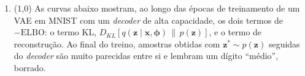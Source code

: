 \documentclass[11pt,a4paper]{article}
\begin{document}
\begin{enumerate}[1)]
\pagebreak
\item (1{,}0) As curvas abaixo mostram, ao longo das épocas de treinamento de um VAE em MNIST com um \textit{decoder} de alta capacidade, os dois termos de $-\mathrm{ELBO}$: o termo KL, $D_{KL}\!\left[q(\mathbf{z} \mid \mathbf{x}, \boldsymbol{\phi})\,\|\,p(\mathbf{z})\right]$, e o termo de reconstrução. Ao final do treino, amostras obtidas com $\mathbf{z}^{*} \sim p(\mathbf{z})$ seguidas do \textit{decoder} são muito parecidas entre si e lembram um dígito ``médio'', borrado.

\begin{center}
\end{center}


\end{enumerate}
\end{document}
